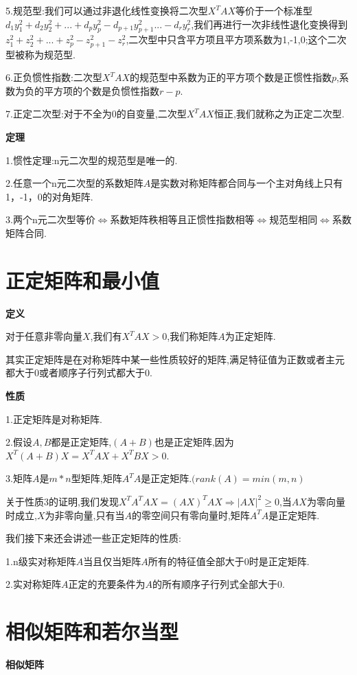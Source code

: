 \documentclass[oneside]{book}
\begin{document}
	5.规范型:我们可以通过非退化线性变换将二次型$X^{T}AX$等价于一个标准型$d_{1}y_{1}^{2}+d_{2}y_{2}^{2}+...+d_{p}y_{p}^{2}-d_{p+1}y_{p+1}^{2}...-d_{r}y_{r}^{2}$,我们再进行一次非线性退化变换得到$z_{1}^{2}+z_{2}^{2}+...+z_{p}^{2}-z_{p+1}^{2}-z_{r}^{2}$,二次型中只含平方项且平方项系数为1,-1,0;这个二次型被称为规范型.
	
	6.正负惯性指数:二次型$X^{T}AX$的规范型中系数为正的平方项个数是正惯性指数$p$,系数为负的平方项的个数是负惯性指数$r-p$.
	
	7.正定二次型:对于不全为0的自变量,二次型$X^{T}AX$恒正,我们就称之为正定二次型.
	
	\textbf{定理}
	
	1.惯性定理:n元二次型的规范型是唯一的.
	
	2.任意一个n元二次型的系数矩阵$A$是实数对称矩阵都合同与一个主对角线上只有1，-1，0的对角矩阵.
	
	3.两个n元二次型等价$\Leftrightarrow$系数矩阵秩相等且正惯性指数相等$\Leftrightarrow$规范型相同$\Leftrightarrow$系数矩阵合同.
	
	\chapter{正定矩阵和最小值}
	\textbf{定义}
	
	对于任意非零向量$X$,我们有$X^{T}AX>0$,我们称矩阵$A$为正定矩阵.
	
	其实正定矩阵是在对称矩阵中某一些性质较好的矩阵,满足特征值为正数或者主元都大于0或者顺序子行列式都大于0.
	
	\textbf{性质}
	
	1.正定矩阵是对称矩阵.
	
	2.假设$A,B$都是正定矩阵,$(A+B)$也是正定矩阵,因为$X^{T}(A+B)X=X^{T}AX+X^{T}BX>0$.
	
	3.矩阵$A$是$m*n$型矩阵,矩阵$A^{T}A$是正定矩阵.$(rank(A)=min(m,n)$
	
	关于性质3的证明,我们发现$X^{T}A^{T}AX=(AX)^{T}AX\Rightarrow |AX|^{2}\geq 0$,当$AX$为零向量时成立,$X$为非零向量,只有当$A$的零空间只有零向量时,矩阵$A^{T}A$是正定矩阵.
	
	我们接下来还会讲述一些正定矩阵的性质:
	
	1.n级实对称矩阵$A$当且仅当矩阵$A$所有的特征值全部大于0时是正定矩阵.
	
	2.实对称矩阵$A$正定的充要条件为$A$的所有顺序子行列式全部大于0.
	
	
	\chapter{相似矩阵和若尔当型}
	\textbf{相似矩阵}
	
\end{document}
